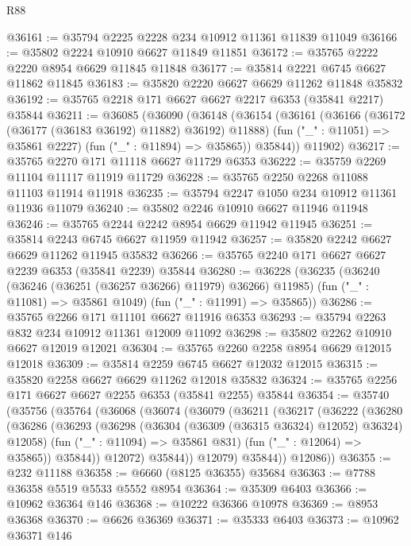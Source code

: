 \begin{lexlean}{R88}
\begin{coremodule}
@36161 := @35794 @2225 @2228 @234 @10912 @11361 @11839 @11049
@36166 := @35802 @2224 @10910 @6627 @11849 @11851
@36172 := @35765 @2222 @2220 @8954 @6629 @11845 @11848
@36177 := @35814 @2221 @6745 @6627 @11862 @11845
@36183 := @35820 @2220 @6627 @6629 @11262 @11848 @35832
@36192 := @35765 @2218 @171 @6627 @6627 @2217 @6353 (@35841 @2217) @35844
@36211 := @36085
    (@36090
      (@36148
        (@36154
          (@36161
            (@36166 (@36172 (@36177 (@36183 @36192) @11882) @36192) @11888)
            (fun ("_" : @11051) => @35861 @2227)
            (fun ("_" : @11894) => @35865))
          @35844))
      @11902)
@36217 := @35765 @2270 @171 @11118 @6627 @11729 @6353
@36222 := @35759 @2269 @11104 @11117 @11919 @11729
@36228 := @35765 @2250 @2268 @11088 @11103 @11914 @11918
@36235 := @35794 @2247 @1050 @234 @10912 @11361 @11936 @11079
@36240 := @35802 @2246 @10910 @6627 @11946 @11948
@36246 := @35765 @2244 @2242 @8954 @6629 @11942 @11945
@36251 := @35814 @2243 @6745 @6627 @11959 @11942
@36257 := @35820 @2242 @6627 @6629 @11262 @11945 @35832
@36266 := @35765 @2240 @171 @6627 @6627 @2239 @6353 (@35841 @2239) @35844
@36280 := @36228
    (@36235
      (@36240 (@36246 (@36251 (@36257 @36266) @11979) @36266) @11985)
      (fun ("_" : @11081) => @35861 @1049)
      (fun ("_" : @11991) => @35865))
@36286 := @35765 @2266 @171 @11101 @6627 @11916 @6353
@36293 := @35794 @2263 @832 @234 @10912 @11361 @12009 @11092
@36298 := @35802 @2262 @10910 @6627 @12019 @12021
@36304 := @35765 @2260 @2258 @8954 @6629 @12015 @12018
@36309 := @35814 @2259 @6745 @6627 @12032 @12015
@36315 := @35820 @2258 @6627 @6629 @11262 @12018 @35832
@36324 := @35765 @2256 @171 @6627 @6627 @2255 @6353 (@35841 @2255) @35844
@36354 := @35740
    (@35756
      (@35764
        (@36068
          (@36074
            (@36079
              (@36211
                (@36217
                  (@36222
                    (@36280
                      (@36286
                        (@36293
                          (@36298 (@36304 (@36309 (@36315 @36324) @12052) @36324) @12058)
                          (fun ("_" : @11094) => @35861 @831)
                          (fun ("_" : @12064) => @35865))
                        @35844))
                    @12072)
                  @35844))
              @12079)
            @35844))
        @12086))
@36355 := @232 @11188
@36358 := @6660 (@8125 @36355) @35684
@36363 := @7788 @36358 @5519 @5533 @5552 @8954
@36364 := @35309 @6403
@36366 := @10962 @36364 @146
@36368 := @10222 @36366 @10978
@36369 := @8953 @36368
@36370 := @6626 @36369
@36371 := @35333 @6403
@36373 := @10962 @36371 @146

\end{coremodule}
\end{lexlean}

